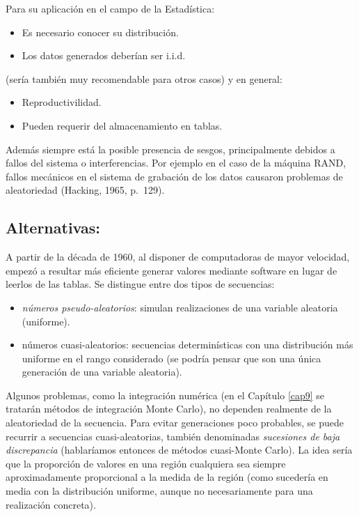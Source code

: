 \documentclass[
]{book}
\theoremstyle{break}
\theoremstyle{definition}
\theoremstyle{definition}
\theoremstyle{definition}
\theoremstyle{remark}
\begin{document}
Para su aplicación en el campo de la Estadística:

\begin{itemize}
\item
  Es necesario conocer su distribución.
\item
  Los datos generados deberían ser i.i.d.
\end{itemize}

(sería también muy recomendable para otros casos) y en general:

\begin{itemize}
\item
  Reproductivilidad.
\item
  Pueden requerir del almacenamiento en tablas.
\end{itemize}

Además siempre está la posible presencia de sesgos, principalmente debidos a fallos del sistema o interferencias.
Por ejemplo en el caso de la máquina RAND, fallos mecánicos en el sistema de grabación de los datos causaron problemas de aleatoriedad (Hacking, 1965, p.~129).

\hypertarget{alternativas}{%
\subsection{Alternativas:}\label{alternativas}}

A partir de la década de 1960, al disponer de computadoras de mayor velocidad, empezó a resultar más eficiente generar valores mediante software en lugar de leerlos de las tablas.
Se distingue entre dos tipos de secuencias:

\begin{itemize}
\item
  \emph{números pseudo-aleatorios}: simulan realizaciones de una variable aleatoria (uniforme).
\item
  números cuasi-aleatorios: secuencias determinísticas con una distribución más uniforme en el rango considerado (se podría pensar que son una única generación de una variable aleatoria).
\end{itemize}

Algunos problemas, como la integración numérica (en el Capítulo \ref{cap9} se tratarán métodos de integración Monte Carlo), no dependen realmente de la aleatoriedad de la secuencia. Para evitar generaciones poco probables, se puede recurrir a secuencias cuasi-aleatorias, también denominadas \emph{sucesiones de baja discrepancia} (hablaríamos entonces de métodos cuasi-Monte Carlo). La idea sería que la proporción de valores en una región cualquiera sea siempre aproximadamente proporcional a la medida de la región (como sucedería en media con la distribución uniforme, aunque no necesariamente para una realización concreta).
\end{document}
